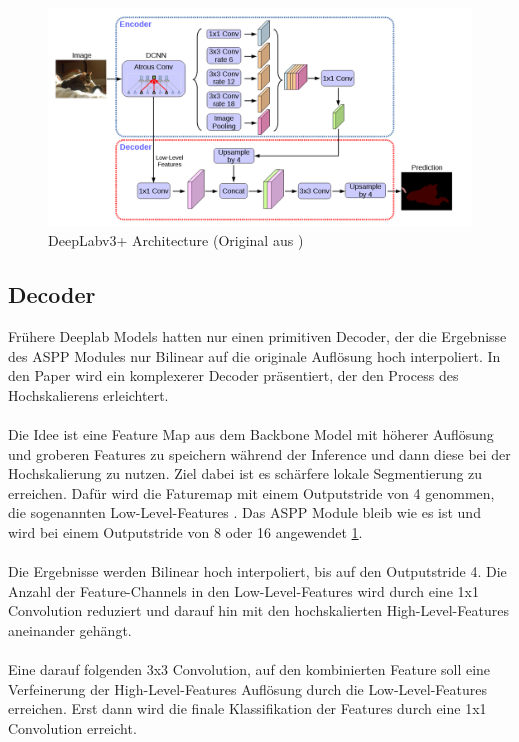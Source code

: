 \documentclass[12pt,DIV=15,BCOR=15mm,twoside,headsepline,abstract=true,listof=totoc,bibliography=totoc]{scrreprt}
\theoremstyle{remark}    %
\begin{document}
    \begin{figure}[ht]
        \centering
        \includegraphics[width=0.9\linewidth]{pics/Arc.png}
        \caption{DeepLabv3+ Architecture (Original aus \cite{chen2018encoderdecoderatrousseparableconvolution})}
        \label{fig:deeplabv3plus}
    \end{figure}

    \subsection{Decoder} 

    Frühere Deeplab Models hatten nur einen primitiven Decoder, der die Ergebnisse des \ac{ASPP} Modules nur Bilinear auf die originale
    Auflösung hoch interpoliert. In den Paper \cite{chen2018encoderdecoderatrousseparableconvolution} wird ein komplexerer Decoder präsentiert, 
    der den Process des Hochskalierens erleichtert.\\\\
    Die Idee ist eine Feature Map aus dem Backbone Model mit höherer Auflösung und groberen Features zu speichern während der Inference 
    und dann diese bei der Hochskalierung zu nutzen. Ziel dabei ist es schärfere lokale Segmentierung zu erreichen. 
    Dafür wird die Faturemap mit einem Outputstride von 4 genommen, die sogenannten Low-Level-Features \cite{chen2018encoderdecoderatrousseparableconvolution}. 
    Das \ac{ASPP} Module bleib wie es ist und wird bei einem Outputstride von 8 oder 16 angewendet \ref{fig:deeplabv3plus}.\\\\
    Die Ergebnisse werden Bilinear hoch interpoliert, bis auf den Outputstride 4. Die Anzahl der Feature-Channels in den Low-Level-Features wird durch
    eine 1x1 Convolution reduziert und darauf hin mit den hochskalierten High-Level-Features aneinander gehängt.\\\\ 
    Eine darauf folgenden 3x3 Convolution, auf den kombinierten Feature soll eine Verfeinerung der High-Level-Features Auflösung durch die 
    Low-Level-Features erreichen. Erst dann wird die finale Klassifikation der Features durch eine 1x1 Convolution erreicht.
\end{document}
